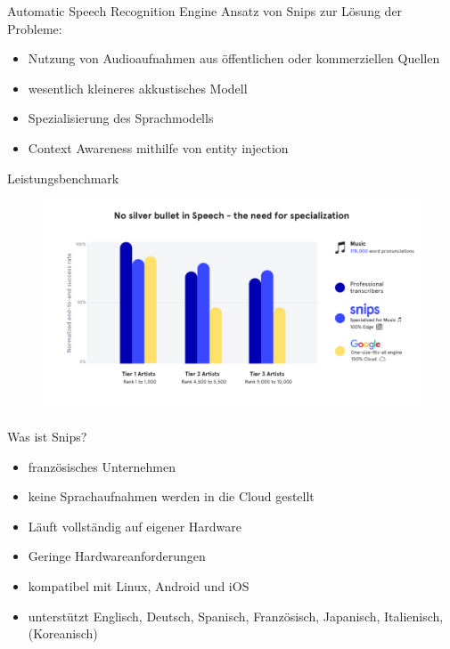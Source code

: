 \documentclass[aspectratio=169]{beamer}
\begin{document}
\begin{frame}{Automatic Speech Recognition Engine}
	Ansatz von Snips zur Lösung der Probleme:
	\begin{itemize}
		\item Nutzung von Audioaufnahmen aus öffentlichen oder kommerziellen Quellen
		\item wesentlich kleineres akkustisches Modell
		\item Spezialisierung des Sprachmodells
		\item Context Awareness mithilfe von entity injection
	\end{itemize}
\end{frame}

\begin{frame}{Leistungsbenchmark}
	\begin{figure}
		\includegraphics[scale=0.3]{images/benchmark-3}
	\end{figure}
\end{frame}

\begin{frame}{Was ist Snips?}
	\begin{itemize}
		\item französisches Unternehmen
		\item keine Sprachaufnahmen werden in die Cloud gestellt
		\item Läuft vollständig auf eigener Hardware
		\item Geringe Hardwareanforderungen
		\item kompatibel mit Linux, Android und iOS
		\item unterstützt Englisch, Deutsch, Spanisch, Französisch, Japanisch, Italienisch, (Koreanisch)
	\end{itemize}
\end{frame}
\end{document}

